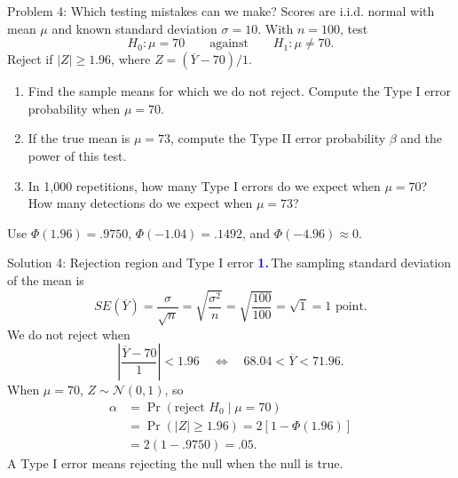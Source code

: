 \documentclass[notes,10pt, aspectratio=169]{beamer}
\newif\ifshowsolutions
\newcommand{\answerpart}[1]{\textcolor{blue}{\textbf{#1.}}\,}
\begin{document}
\begin{frame}{Problem 4: Which testing mistakes can we make?}
Scores are i.i.d. normal with mean $\mu$ and known standard deviation $\sigma=10$. With $n=100$, test
\[
H_0:\mu=70 \qquad\text{against}\qquad H_1:\mu\neq70.
\]
Reject if $|Z|\geq1.96$, where $Z=(\overline Y-70)/1$.
\begin{enumerate}
\setlength{\itemsep}{6pt}
\item Find the sample means for which we do not reject. Compute the Type I error probability when $\mu=70$.
\item If the true mean is $\mu=73$, compute the Type II error probability $\beta$ and the power of this test.
\item In 1,000 repetitions, how many Type I errors do we expect when $\mu=70$? How many detections do we expect when $\mu=73$?
\end{enumerate}
\vspace{3pt}
Use $\Phi(1.96)=.9750$, $\Phi(-1.04)=.1492$, and $\Phi(-4.96)\approx0$.
\end{frame}

\ifshowsolutions
\begin{frame}{Solution 4: Rejection region and Type I error}
\small
\answerpart{1}The sampling standard deviation of the mean is
\[
SE(\overline Y)=\frac{\sigma}{\sqrt n}
=\sqrt{\frac{\sigma^2}{n}}
=\sqrt{\frac{100}{100}}=\sqrt1=1\text{ point}.
\]
We do not reject when
\[
\left|\frac{\overline Y-70}{1}\right|<1.96
\quad\Longleftrightarrow\quad
\boxed{68.04<\overline Y<71.96}.
\]
When $\mu=70$, $Z\sim\mathcal N(0,1)$, so
\begin{align*}
\alpha&=\Pr(\text{reject }H_0\mid\mu=70)\\
&=\Pr(|Z|\geq1.96)=2[1-\Phi(1.96)]\\
&=2(1-.9750)=\boxed{.05}.
\end{align*}
A Type I error means rejecting the null when the null is true.
\end{frame}
\end{document}
